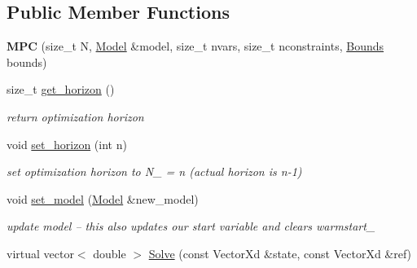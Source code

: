 \subsection*{Public Member Functions}
\begin{DoxyCompactItemize}
\item 
\mbox{\label{classMPC_a2eb1e1066f5f8fa21b749c8fd7f65214}} 
{\bfseries M\+PC} (size\+\_\+t N, \mbox{\hyperlink{classModel}{Model}} \&model, size\+\_\+t nvars, size\+\_\+t nconstraints, \mbox{\hyperlink{structBounds}{Bounds}} bounds)
\item 
\mbox{\label{classMPC_a72dfd8e42f90e52188826e28b4a9ef12}} 
size\+\_\+t \mbox{\hyperlink{classMPC_a72dfd8e42f90e52188826e28b4a9ef12}{get\+\_\+horizon}} ()
\begin{DoxyCompactList}\small\item\em return optimization horizon \end{DoxyCompactList}\item 
\mbox{\label{classMPC_aa12974d3c66958fb98d9fc5a6a5248de}} 
void \mbox{\hyperlink{classMPC_aa12974d3c66958fb98d9fc5a6a5248de}{set\+\_\+horizon}} (int n)
\begin{DoxyCompactList}\small\item\em set optimization horizon to N\+\_\+ = n (actual horizon is n-\/1) \end{DoxyCompactList}\item 
\mbox{\label{classMPC_a9ed8c79c43f0b26ba9ac8ed70bb50b73}} 
void \mbox{\hyperlink{classMPC_a9ed8c79c43f0b26ba9ac8ed70bb50b73}{set\+\_\+model}} (\mbox{\hyperlink{classModel}{Model}} \&new\+\_\+model)
\begin{DoxyCompactList}\small\item\em update model -- this also updates our start variable and clears warmstart\+\_\+ \end{DoxyCompactList}\item 
virtual vector$<$ double $>$ \mbox{\hyperlink{classMPC_ae07d02edbf31f94d738cfa206e5b2d77}{Solve}} (const Vector\+Xd \&state, const Vector\+Xd \&ref)
\end{DoxyCompactItemize}
